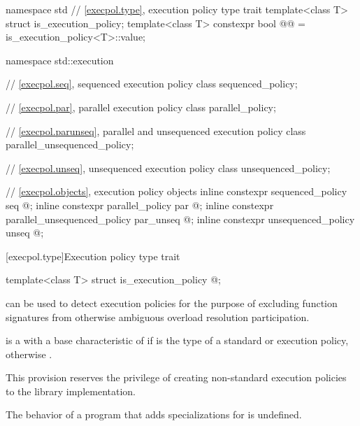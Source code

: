 %
\begin{codeblock}
namespace std {
  // \ref{execpol.type}, execution policy type trait
  template<class T> struct is_execution_policy;
  template<class T> constexpr bool @@ = is_execution_policy<T>::value;
}

namespace std::execution {
  // \ref{execpol.seq}, sequenced execution policy
  class sequenced_policy;

  // \ref{execpol.par}, parallel execution policy
  class parallel_policy;

  // \ref{execpol.parunseq}, parallel and unsequenced execution policy
  class parallel_unsequenced_policy;

  // \ref{execpol.unseq}, unsequenced execution policy
  class unsequenced_policy;

  // \ref{execpol.objects}, execution policy objects
  inline constexpr sequenced_policy            seq{ @\unspec@ };
  inline constexpr parallel_policy             par{ @\unspec@ };
  inline constexpr parallel_unsequenced_policy par_unseq{ @\unspec@ };
  inline constexpr unsequenced_policy          unseq{ @\unspec@ };
}
\end{codeblock}

[execpol.type]{Execution policy type trait}

%
\begin{itemdecl}
template<class T> struct is_execution_policy { @\seebelow@ };
\end{itemdecl}

\begin{itemdescr}
\pnum
{} can be used to detect execution policies for the
purpose of excluding function signatures from otherwise ambiguous overload
resolution participation.

\pnum
{} is a  with a
base characteristic of  if  is the type of a standard
or 
execution policy, otherwise .

\begin{note}
This provision reserves the privilege of creating non-standard execution
policies to the library implementation.
\end{note}

\pnum
The behavior of a program that adds specializations for
 is undefined.
\end{itemdescr}

